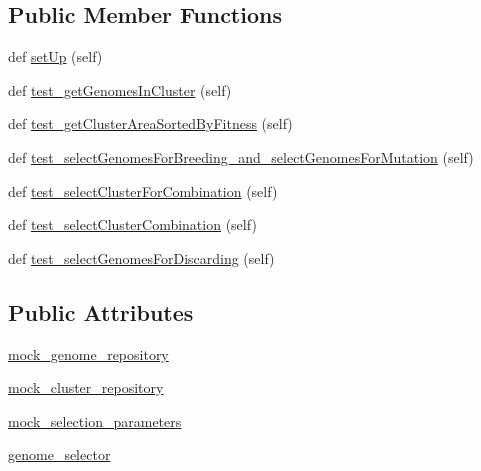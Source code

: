 \subsection*{Public Member Functions}
\begin{DoxyCompactItemize}
\item 
def \hyperlink{classNEAT__PyGenetics_1_1NEAT_1_1Tests_1_1AnalystTests_1_1test__genomeSelector_1_1test__genomeSelector_a73634e74c61c8367095ed89b1a9ffa8d}{set\+Up} (self)
\item 
def \hyperlink{classNEAT__PyGenetics_1_1NEAT_1_1Tests_1_1AnalystTests_1_1test__genomeSelector_1_1test__genomeSelector_abf45d8dbc127efe9b7a89415b2f0b605}{test\+\_\+get\+Genomes\+In\+Cluster} (self)
\item 
def \hyperlink{classNEAT__PyGenetics_1_1NEAT_1_1Tests_1_1AnalystTests_1_1test__genomeSelector_1_1test__genomeSelector_a845cb361d31d78f62c573610a01c9c52}{test\+\_\+get\+Cluster\+Area\+Sorted\+By\+Fitness} (self)
\item 
def \hyperlink{classNEAT__PyGenetics_1_1NEAT_1_1Tests_1_1AnalystTests_1_1test__genomeSelector_1_1test__genomeSelector_abe868724b36a1423c915ca001bdfacb7}{test\+\_\+select\+Genomes\+For\+Breeding\+\_\+and\+\_\+select\+Genomes\+For\+Mutation} (self)
\item 
def \hyperlink{classNEAT__PyGenetics_1_1NEAT_1_1Tests_1_1AnalystTests_1_1test__genomeSelector_1_1test__genomeSelector_a02f6228ac878117e968633e7d0652e37}{test\+\_\+select\+Cluster\+For\+Combination} (self)
\item 
def \hyperlink{classNEAT__PyGenetics_1_1NEAT_1_1Tests_1_1AnalystTests_1_1test__genomeSelector_1_1test__genomeSelector_a1a32ff097226fd39d70886ef046293d4}{test\+\_\+select\+Cluster\+Combination} (self)
\item 
def \hyperlink{classNEAT__PyGenetics_1_1NEAT_1_1Tests_1_1AnalystTests_1_1test__genomeSelector_1_1test__genomeSelector_a5c10235f34e1e4e56e06ad1c17d787c5}{test\+\_\+select\+Genomes\+For\+Discarding} (self)
\end{DoxyCompactItemize}
\subsection*{Public Attributes}
\begin{DoxyCompactItemize}
\item 
\hyperlink{classNEAT__PyGenetics_1_1NEAT_1_1Tests_1_1AnalystTests_1_1test__genomeSelector_1_1test__genomeSelector_af28f36e08d36b7693e8d181ee8143751}{mock\+\_\+genome\+\_\+repository}
\item 
\hyperlink{classNEAT__PyGenetics_1_1NEAT_1_1Tests_1_1AnalystTests_1_1test__genomeSelector_1_1test__genomeSelector_a54e3883498756f3e673b2eebc77890cb}{mock\+\_\+cluster\+\_\+repository}
\item 
\hyperlink{classNEAT__PyGenetics_1_1NEAT_1_1Tests_1_1AnalystTests_1_1test__genomeSelector_1_1test__genomeSelector_ac77001932f6d9ab981a690257f7ff5d1}{mock\+\_\+selection\+\_\+parameters}
\item 
\hyperlink{classNEAT__PyGenetics_1_1NEAT_1_1Tests_1_1AnalystTests_1_1test__genomeSelector_1_1test__genomeSelector_a824c9616385543a8e9fe05a641932676}{genome\+\_\+selector}
\end{DoxyCompactItemize}


